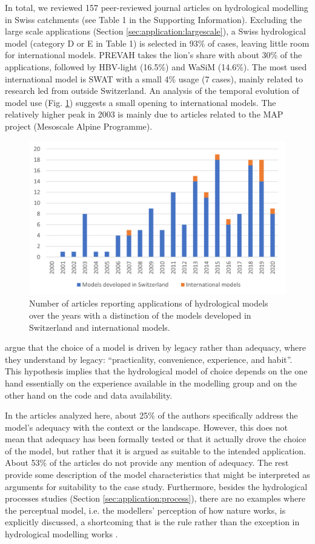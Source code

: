 \documentclass[10pt,a4paper]{article}
\begin{document}
In total, we reviewed 157 peer-reviewed journal articles on hydrological
modelling in Swiss catchments (see Table 1 in the Supporting
Information). Excluding the large scale applications (Section \ref{sec:application:largescale}), a
Swiss hydrological model (category D or E in Table 1) is selected in
93\% of cases, leaving little room for international models. PREVAH
takes the lion's share with about 30\% of the applications, followed by
HBV-light (16.5\%) and WaSiM (14.6\%). The most used international
model is SWAT with a small 4\% usage (7 cases), mainly related to
research led from outside Switzerland. An analysis of the temporal
evolution of model use (Fig. \ref{fig:bars})
suggests a small opening to international models. The relatively higher
peak in 2003 is mainly due to articles related to the MAP project
(Mesoscale Alpine Programme).

\begin{figure}[htb]
	\begin{center}
		\includegraphics[width=0.70\columnwidth]{figures/histogram.png}
		\caption{{Number of articles reporting applications of hydrological models over
				the years with a distinction of the models developed in Switzerland and
				international models.
				{\label{fig:bars}}
		}}
	\end{center}
\end{figure}

\citet{Addor_2019} argue that the choice of a model is driven by legacy
rather than adequacy, where they understand by legacy: ``practicality,
convenience, experience, and habit''. This hypothesis implies that the
hydrological model of choice depends on the one hand essentially on the
experience available in the modelling group and on the other hand on
the code and data availability. 

In the articles analyzed here, about 25\% of the authors specifically
address the model's adequacy with the context or the landscape. However,
this does not mean that adequacy has been formally tested or that it
actually drove the choice of the model, but rather that it is argued as
suitable to the intended application. About 53\% of the articles do not
provide any mention of adequacy. The rest provide some description of
the model characteristics that might be interpreted as arguments for
suitability to the case study. Furthermore, besides the hydrological
processes studies (Section \ref{sec:application:process}), there are no examples where the
perceptual model, i.e. the modellers' perception of how nature works, is
explicitly discussed, a shortcoming that is the rule rather than the
exception in hydrological modelling works \citep{beven2021}.
\end{document}
